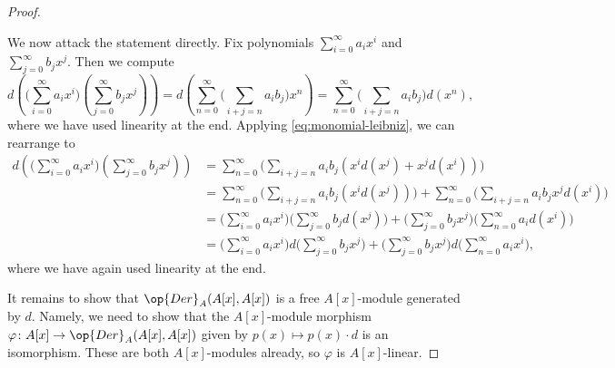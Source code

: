 \documentclass[../notes.tex]{subfiles}
\begin{document}
\begin{proof}
\begin{itemize}
		We now attack the statement directly. Fix polynomials $\sum_{i=0}^\infty a_ix^i$ and $\sum_{j=0}^\infty b_jx^j$. Then we compute
		\[d\left(\Bigg(\sum_{i=0}^\infty a_ix^i\Bigg)\left(\sum_{j=0}^\infty b_jx^j\right)\right) = d\left(\sum_{n=0}^\infty\Bigg(\sum_{i+j=n}a_ib_j\Bigg)x^n\right) = \sum_{n=0}^\infty\Bigg(\sum_{i+j=n}a_ib_j\Bigg)d\left(x^n\right),\]
		where we have used linearity at the end. Applying \autoref{eq:monomial-leibniz}, we can rearrange to
		\begin{align*}
			d\left(\Bigg(\sum_{i=0}^\infty a_ix^i\Bigg)\left(\sum_{j=0}^\infty b_jx^j\right)\right) &= \sum_{n=0}^\infty\Bigg(\sum_{i+j=n}a_ib_j\left(x^id\left(x^j\right)+x^jd\left(x^i\right)\right)\Bigg) \\
			&= \sum_{n=0}^\infty\Bigg(\sum_{i+j=n}a_ib_j\left(x^id\left(x^j\right)\right)\Bigg)+\sum_{n=0}^\infty\Bigg(\sum_{i+j=n}a_ib_jx^jd\left(x^i\right)\Bigg) \\
			&= \Bigg(\sum_{i=0}^\infty a_ix^i\Bigg)\Bigg(\sum_{j=0}^\infty b_jd\left(x^j\right)\Bigg)+\Bigg(\sum_{j=0}^\infty b_jx^j\Bigg)\Bigg(\sum_{n=0}^\infty a_id\left(x^i\right)\Bigg) \\
			&= \Bigg(\sum_{i=0}^\infty a_ix^i\Bigg)d\Bigg(\sum_{j=0}^\infty b_jx^j\Bigg)+\Bigg(\sum_{j=0}^\infty b_jx^j\Bigg)d\Bigg(\sum_{n=0}^\infty a_ix^i\Bigg),
		\end{align*}
		where we have again used linearity at the end.
	\end{itemize}
	It remains to show that $\op{Der}_A(A[x],A[x])$ is a free $A[x]$-module generated by $d$. Namely, we need to show that the $A[x]$-module morphism $\varphi\colon A[x]\to\op{Der}_A(A[x],A[x])$ given by $p(x)\mapsto p(x)\cdot d$ is an isomorphism. These are both $A[x]$-modules already, so $\varphi$ is $A[x]$-linear.


\end{proof}
\end{document}
